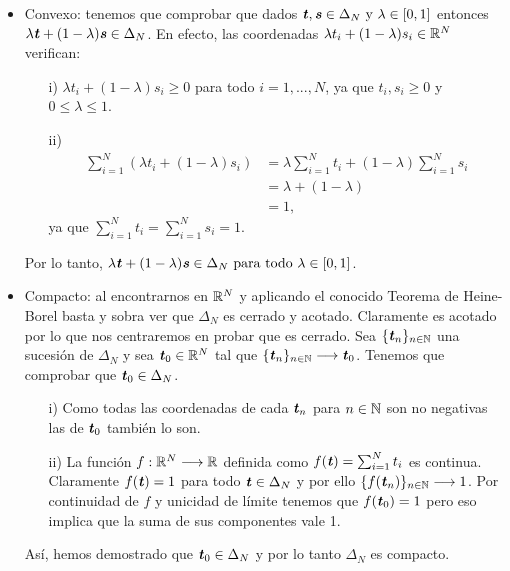 	\begin{itemize}
		\item  Convexo: tenemos que comprobar que dados $ \textbf{\emph{t}}, \textbf{\emph{s}} \in \Delta_N \text{ y } \lambda \in \lbrack 0,1 \rbrack $ entonces $ \lambda\textbf{\emph{t}} + (1-\lambda)\textbf{\emph{s}} \in \Delta_N $. En efecto, las coordenadas $ \lambda t_i + (1-\lambda)s_i \in \mathbb{R}^N $ verifican:
		\begin{itemize}
			\item [i) ] $ \lambda t_i + (1-\lambda)s_i \geq 0 $ para todo $ i = 1,..., N $, ya que $ t_i, s_i \geq 0 $ y $ 0 \leq \lambda \leq 1 $.
			\item [ii) ] 
			\begin{equation*}
			\begin{split}
			\sum_{i=1}^{N} (\lambda t_i + (1-\lambda)s_i) &=   \lambda \sum_{i=1}^{N} t_i + (1-\lambda)\sum_{i=1}^{N} s_i \\
			&= \lambda + (1 - \lambda) \\ &= 1,
			\end{split}
			\end{equation*}ya que $ \sum_{i=1}^{N} t_i = \sum_{i=1}^{N} s_i = 1  $.
		\end{itemize}
	
		Por lo tanto, $ \lambda\textbf{\emph{t}} + (1-\lambda)\textbf{\emph{s}} \in \Delta_N \text{ para todo }\lambda \in \lbrack 0,1 \rbrack $.
		
		\item Compacto: al encontrarnos en $ \mathbb{R}^N $ y aplicando el conocido Teorema de Heine-Borel basta y sobra ver que $ \Delta_N $ es cerrado y acotado. Claramente es acotado por lo que nos centraremos en probar que es cerrado. Sea $ \lbrace \textbf{\emph{t}}_n \rbrace_{ n \in \mathbb{N}} $ una sucesión de $ \Delta_N $ y sea $ \textbf{\emph{t}}_0 \in \mathbb{R}^N $ tal que $ \lbrace \textbf{\emph{t}}_n \rbrace_{ n \in \mathbb{N}} \longrightarrow \textbf{\emph{t}}_0 $. Tenemos que comprobar que $ \textbf{\emph{t}}_0 \in \Delta_N $. 
		\begin{itemize}
		\item[i) ] Como todas las coordenadas de cada $ \textbf{\emph{t}}_n $ para $ n \in \mathbb{N} $ son no negativas las de $ \textbf{\emph{t}}_0 $ también lo son.
		\item[ii) ] La función $ f: \mathbb{R}^N \longrightarrow \mathbb{R} $ definida como $ f(\textbf{\emph{t}}) =  \sum_{i=1}^{N} t_i $ es continua. Claramente $ f(\textbf{\emph{t}}) = 1 $ para todo $ \textbf{\emph{t}} \in \Delta_N $ y por ello $ \lbrace f(\textbf{\emph{t}}_n) \rbrace_{ n \in \mathbb{N}} \longrightarrow 1$. Por continuidad de $ f $ y unicidad de límite tenemos que $ f(\textbf{\emph{t}}_0) = 1 $ pero eso implica que la suma de sus componentes vale 1.
		\end{itemize} 
	
		Así, hemos demostrado que $ \textbf{\emph{t}}_0 \in \Delta_N $ y por lo tanto $ \Delta_N $ es compacto. 
	\end{itemize}

